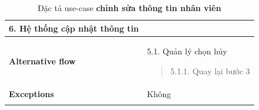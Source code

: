 {\begin{longtable}{| p{} | p{} |}
                    6. Hệ thống cập nhật thông tin
                \\
                \hline
                \begin{flushleft}
                    \textbf{Alternative flow}
                \end{flushleft}
                &
                5.1. Quản lý chọn hủy
                    \begin{quote} 
                    5.1.1. Quay lại bước 3
                    \end{quote}
                \\
                \hline
                    \textbf{Exceptions} 
                &
                    Không
                \\
                \hline
                \caption{Đặc tả use-case \textbf{chỉnh sửa thông tin nhân viên}}
            \end{longtable}
        }
    
